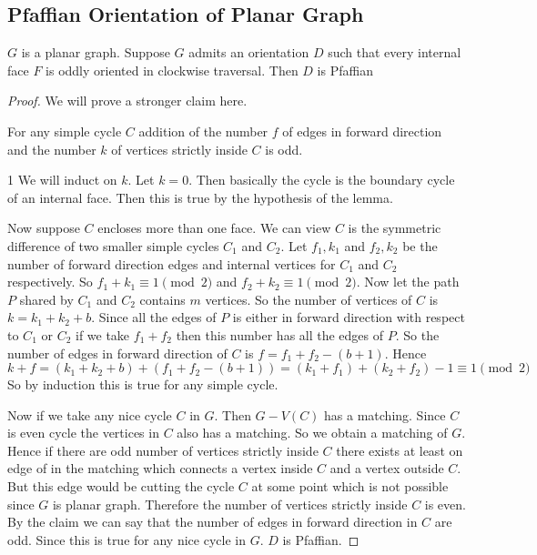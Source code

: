 \subsection{Pfaffian Orientation of Planar Graph}
\begin{lemma}\label{lmfaceoddpf}
	$G$ is a planar graph. Suppose $G$ admits an orientation $D$ such that every internal face $F$ is oddly oriented in clockwise traversal. Then $D$ is Pfaffian
\end{lemma}
\begin{proof}
	We will prove a stronger claim here.
	\begin{claim}
		For any simple cycle $C$ addition of the number $f$ of edges in forward direction and the number $k$ of vertices strictly inside $C$ is odd.
	\end{claim}
\begin{proof-of-claim}{1}
	We will induct on $k$. Let $k=0$. Then basically the cycle is the boundary cycle of an internal face. Then this is true by the hypothesis of the lemma. 
	
	Now suppose $C$ encloses more than one face. We can view $C$ is the symmetric difference of two smaller simple cycles $C_1$ and $C_2$.  Let $f_1,k_1$ and $f_2,k_2$ be	the number of forward direction edges and internal vertices for $C_1$ and $C_2$ respectively. So $f_1+k_1\equiv 1\pmod{2}$ and $f_2+k_2\equiv 1\pmod2$. Now let the path $P$ shared by $C_1$ and $C_2$ contains $m$ vertices. So the number of vertices of $C$ is $k=k_1+k_2+b$. Since all the edges of $P$ is either in forward direction with respect to $C_1$ or $C_2$ if we take $f_1+f_2$ then this number has all the edges of $P$. So the number of edges in forward direction of $C$ is $f=f_1+f_2-(b+1)$. Hence $$k+f=(k_1+k_2+b)+(f_1+f_2-(b+1))=(k_1+f_1)+(k_2+f_2)-1\equiv 1\pmod2$$So by induction this is true for any simple cycle.
\end{proof-of-claim}

Now if we take any nice cycle $C$ in $G$. Then $G-V(C)$ has a matching. Since $C$ is even cycle the vertices in $C$ also has a matching. So we obtain a matching of $G$. Hence if there are odd number of vertices strictly inside $C$ there exists at least on edge of in the matching which connects a vertex inside $C$ and a vertex outside $C$. But this edge would be cutting the cycle $C$ at some point which is not possible since $G$ is planar graph. Therefore the number of vertices strictly inside $C$ is even. By the claim we can say that the number of edges in forward direction in $C$ are odd. Since this is true for any nice cycle in $G$. $D$ is Pfaffian.
\end{proof}
